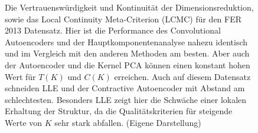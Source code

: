 \begin{figure}[ht]
	\begin{center}
		
	\end{center}
	\caption[FER2013 Qualitätskriterien]{Die Vertrauenswürdigkeit und Kontinuität der Dimensionsreduktion, sowie das Local Continuity Meta-Criterion (LCMC) für den FER 2013 Datensatz. Hier ist die Performance des Convolutional Autoencoders und der Hauptkomponentenanalyse nahezu identisch und im Vergleich mit den anderen Methoden am besten. Aber auch der Autoencoder und die Kernel PCA können einen konstant hohen Wert für $T(K)$ und $C(K)$ erreichen. Auch auf diesem Datensatz schneiden LLE und der Contractive Autoencoder mit Abstand am schlechtesten. Besonders LLE zeigt hier die Schwäche einer lokalen Erhaltung der Struktur, da die Qualitätskriterien für steigende Werte von $K$ sehr stark abfallen. (Eigene Darstellung)}
	\label{fig:FER2013Metrics}
\end{figure}